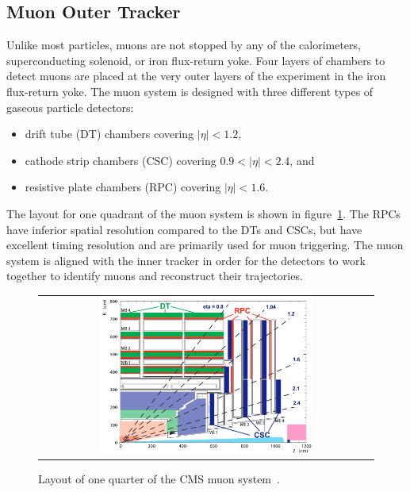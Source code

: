 \subsection{Muon Outer Tracker}
Unlike most particles, muons are not stopped by any of the calorimeters, superconducting solenoid, or iron flux-return yoke. 
Four layers of chambers to detect muons are placed at the very outer layers of the experiment in the iron flux-return yoke. 
The muon system is designed with three different types of gaseous particle detectors: 
\begin{itemize}
\item drift tube (DT) chambers covering $\vert \eta \vert < 1.2$,
\item cathode strip chambers (CSC) covering $0.9 < \vert \eta \vert < 2.4$, and
\item resistive plate chambers (RPC) covering $\vert \eta \vert < 1.6$.
\end{itemize}
The layout for one quadrant of the muon system is shown in figure~\ref{Muon_System}.
The RPCs have inferior spatial resolution compared to the DTs and CSCs, but have excellent timing resolution and are primarily used for muon triggering.
The muon system is aligned with the inner tracker in order for the detectors to work together to identify muons and reconstruct their trajectories.
\begin{figure}[htb]
  \begin{center}
    \begin{tabular}{c}
        \includegraphics[width=0.65\textwidth]{fig_LHC_CMS/Muon_System.png}
    \end{tabular}
    \caption{Layout of one quarter of the CMS muon system~\cite{Bayatian:922757}.
            }
    \label{Muon_System}
  \end{center}
\end{figure}

